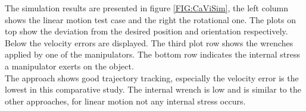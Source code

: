 \documentclass[a4paper,twoside, openright,12pt]{report}
\begin{document}
{%

The simulation results are presented in figure \ref{FIG:CaViSim}, the left column shows the linear motion test case and the right the rotational one. The plots on top show the deviation from the desired position and orientation respectively. Below the velocity errors are displayed. The third plot row shows the wrenches applied by one of the manipulators. The bottom row indicates the internal stress a manipulator exerts on the object.\\
The approach shows good trajectory tracking, especially the velocity error is the lowest in this comparative study. The internal wrench is low and is similar to the other approaches, for linear motion not any internal stress occurs.

}
\end{document}
